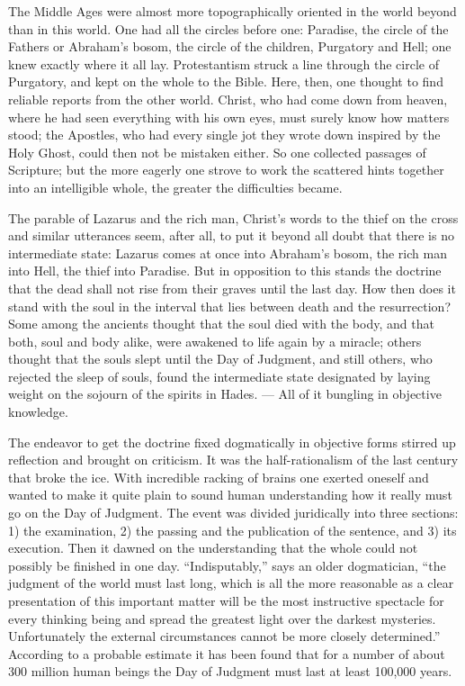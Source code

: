 \documentclass[12pt,a4paper,openany]{book}
\newcommand{\opage}[1]{\marginnote{\footnotesize\textit{[#1]}}}
\begin{document}
The Middle Ages were almost more topographically oriented in the world beyond than in this world. One had all the
circles before one: Paradise, the circle of the Fathers or Abraham's bosom, the circle of the children, Purgatory and
Hell; one knew exactly where it all lay. Protestantism struck a line through the circle of Purgatory, and kept on the
whole to the Bible. Here, then, one thought to find reliable reports from
\setcounter{footnote}{0}%
\opage{88}the other world. Christ, who had come down from heaven, where he had seen everything with his own eyes, must
surely know how matters stood; the Apostles, who had every single jot they wrote down inspired by the Holy Ghost, could
then not be mistaken either. So one collected passages of Scripture; but the more eagerly one strove to work the
scattered hints together into an intelligible whole, the greater the difficulties became.

The parable of Lazarus and the rich man, Christ's words to the thief on the cross and similar utterances seem, after
all, to put it beyond all doubt that there is no intermediate state: Lazarus comes at once into Abraham's bosom, the
rich man into Hell, the thief into Paradise. But in opposition to this stands the doctrine that the dead shall not rise
from their graves until the last day. How then does it stand with the soul in the interval that lies between death
and the resurrection? Some among the ancients thought that the soul died with the body, and that both, soul and body
alike, were awakened to life again by a miracle; others thought that the souls slept until the Day of Judgment, and
still others, who rejected the sleep of souls, found the intermediate state designated by laying weight on the sojourn
of the spirits in Hades. --- All of it bungling in objective knowledge.

The endeavor to get the doctrine fixed dogmatically in objective forms stirred up reflection and brought on
criticism. It was the half-rationalism of the last century that broke the ice. With incredible racking of brains one
exerted oneself and wanted to make it quite plain to sound human understanding how it really must go on the Day of
Judgment. The event was divided juridically into three sections: 1) the examination,
\setcounter{footnote}{0}%
\opage{89}2) the passing and the publication of the sentence, and 3) its execution. Then it dawned on the
understanding that the whole could not possibly be finished in one day. ``Indisputably,'' says an older dogmatician,
``the judgment of the world must last long, which is all the more reasonable as a clear presentation of this important
matter will be the most instructive spectacle for every thinking being and spread the greatest light over the darkest
mysteries. Unfortunately the external circumstances cannot be more closely determined.'' According to a probable
estimate it has been found that for a number of about 300 million human beings the Day of Judgment must last at least
100,000 years.
\end{document}
